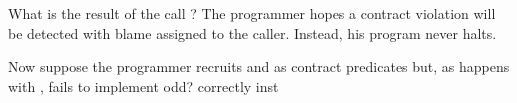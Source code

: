 \documentclass{sigplanconf}
\begin{document}
What is the result of the call ?
The programmer hopes a contract violation will be detected with blame assigned to the caller.
Instead, his program never halts.

Now suppose the programmer recruits  and  as contract predicates but, as happens with , fails to implement odd? correctly inst










\end{document}
